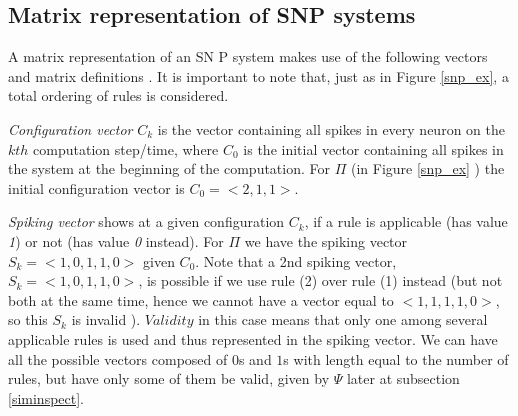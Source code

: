 \documentclass{svmultm}
\begin{document}







\subsection{Matrix representation of SNP systems}
A matrix representation of an SN P system makes use of the
following vectors and matrix definitions \cite{snpbrain}\cite{snpmat} . It is important to note that, just as in Figure \ref{snp_ex}, a total ordering of rules is {considered}.

\textit{Configuration vector} $C_k$ is the vector containing all spikes in every neuron on the $kth$ computation step/time, where $C_0$ is the initial vector containing all spikes in the system at the beginning of the computation. For $\Pi$ (in Figure \ref{snp_ex} ) the initial configuration vector is $C_0 = < 2, 1, 1 >$.

\textit{Spiking vector} shows at a given configuration $C_k$, if a
rule is applicable (has value \textit{1}) or not (has value \textit{0} instead). For $\Pi$ we have the
spiking vector $S_k = < 1, 0, 1, 1, 0 >$ given $C_0$.
Note that a 2nd spiking vector, $S_k = < 1, 0, 1, 1, 0 >$, is
possible if we use rule (2) over rule (1) instead (but not both at the same time, hence we cannot have a vector equal to
$< 1, 1, 1, 1, 0>${, so this $S_k$ is invalid }{}). $Validity$ in this case means that only one among several applicable rules is used and thus represented in the spiking vector. We can have all the possible vectors composed of $0$s and $1$s with length equal to the number of rules, but have only some of them be valid, given by $\Psi$ later at subsection \ref{siminspect}.
\end{document}
